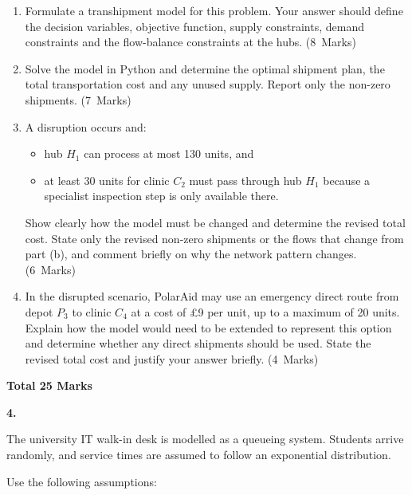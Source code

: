 \documentclass[11pt,a4paper]{article}
\newcommand{\markalloc}[1]{\nobreak\hfill\mbox{(#1 Marks)}}
\newcommand{\questiontotal}[1]{\begin{flushright}\textbf{Total #1 Marks}\end{flushright}}
\begin{document}
\begin{enumerate}
\item Formulate a transhipment model for this problem. Your answer should define the decision variables, objective function, supply constraints, demand constraints and the flow-balance constraints at the hubs. \markalloc{8}

\item Solve the model in Python and determine the optimal shipment plan, the total transportation cost and any unused supply. Report only the non-zero shipments. \markalloc{7}

\item A disruption occurs and:
\begin{itemize}[leftmargin=0.9cm, itemsep=0.25em]
\item hub $H_1$ can process at most 130 units, and
\item at least 30 units for clinic $C_2$ must pass through hub $H_1$ because a specialist inspection step is only available there.
\end{itemize}
Show clearly how the model must be changed and determine the revised total cost. State only the revised non-zero shipments or the flows that change from part (b), and comment briefly on why the network pattern changes. \markalloc{6}

\item In the disrupted scenario, PolarAid may use an emergency direct route from depot $P_3$ to clinic $C_4$ at a cost of \pounds9 per unit, up to a maximum of 20 units.
Explain how the model would need to be extended to represent this option and determine whether any direct shipments should be used. State the revised total cost and justify your answer briefly. \markalloc{4}
\end{enumerate}

\questiontotal{25}

\newpage

\textbf{4.}

The university IT walk-in desk is modelled as a queueing system.
Students arrive randomly, and service times are assumed to follow an exponential distribution.

Use the following assumptions:
\end{document}
